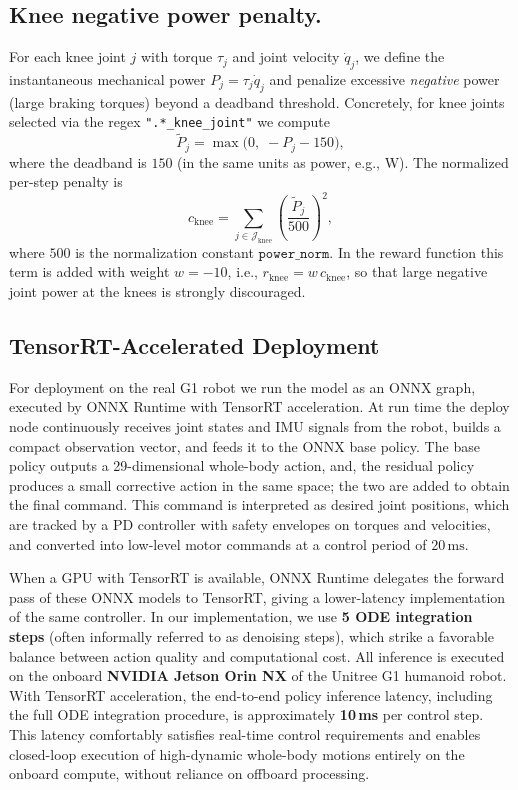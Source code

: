\subsection{Knee negative power penalty.}
\label{sec:power}
For each knee joint $j$ with torque $\tau_j$ and joint velocity $\dot{q}_j$,
we define the instantaneous mechanical power
\(
 P_j = \tau_j \dot{q}_j
\)
and penalize excessive \emph{negative} power (large braking torques) beyond a
deadband threshold. Concretely, for knee joints selected via the regex
{\small\verb|".*_knee_joint"|} we compute
\begin{equation}
  \tilde{P}_j = \max\!\bigl(0,\; - P_j - 150\bigr),
\end{equation}
where the deadband is $150$ (in the same units as power, e.g., W).
The normalized per-step penalty is
\begin{equation}
  c_{\text{knee}} = \sum_{j \in \mathcal{J}_\text{knee}}
    \left(\frac{\tilde{P}_j}{500}\right)^{\!2},
\end{equation}
where $500$ is the normalization constant $\texttt{power\_norm}$.
In the reward function this term is added with weight $w=-10$, i.e.,
\(
 r_{\text{knee}} = w \, c_{\text{knee}}
\),
so that large negative joint power at the knees is strongly discouraged.

\subsection{TensorRT-Accelerated Deployment}
\label{sec:hdc-tensorrt-deploy}

For deployment on the real G1 robot we run the model as an ONNX graph, executed by ONNX Runtime with TensorRT acceleration. At run time the deploy node continuously receives joint states and IMU signals from the robot, builds a compact observation vector, and feeds it to the ONNX base policy.
The base policy outputs a 29-dimensional whole-body action, and, the residual policy produces a small corrective action in the same space; the two are added to obtain the final command.
This command is interpreted as desired joint positions, which are tracked by a PD controller with safety envelopes on torques and velocities, and converted into low-level motor commands at a control period of $20\,\mathrm{ms}$.

When a GPU with TensorRT is available, ONNX Runtime delegates the forward pass of these ONNX models to TensorRT, giving a lower-latency implementation of the same controller. In our implementation, we use \textbf{5 ODE integration steps}
(often informally referred to as denoising steps),
which strike a favorable balance between action quality and computational cost.
All inference is executed on the onboard
\textbf{NVIDIA Jetson Orin NX} of the Unitree G1 humanoid robot. With TensorRT acceleration, the end-to-end policy inference latency,
including the full ODE integration procedure,
is approximately \textbf{10\,ms} per control step. This latency comfortably satisfies real-time control requirements
and enables closed-loop execution of high-dynamic whole-body motions
entirely on the onboard compute, without reliance on offboard processing.

